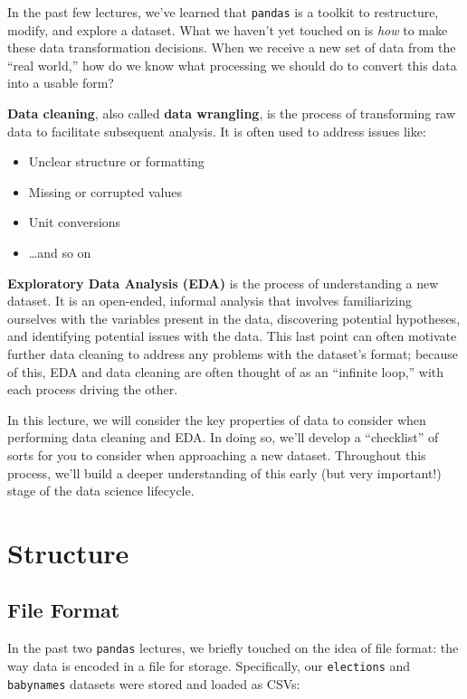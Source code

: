 \documentclass[
  letterpaper,
  DIV=11,
  numbers=noendperiod]{scrreprt}
\providecommand{\tightlist}{%
  \setlength{\itemsep}{0pt}\setlength{\parskip}{0pt}}\usepackage{longtable,booktabs,array}
\begin{document}
In the past few lectures, we've learned that \texttt{pandas} is a
toolkit to restructure, modify, and explore a dataset. What we haven't
yet touched on is \emph{how} to make these data transformation
decisions. When we receive a new set of data from the ``real world,''
how do we know what processing we should do to convert this data into a
usable form?

\textbf{Data cleaning}, also called \textbf{data wrangling}, is the
process of transforming raw data to facilitate subsequent analysis. It
is often used to address issues like:

\begin{itemize}
\tightlist
\item
  Unclear structure or formatting
\item
  Missing or corrupted values
\item
  Unit conversions
\item
  \ldots and so on
\end{itemize}

\textbf{Exploratory Data Analysis (EDA)} is the process of understanding
a new dataset. It is an open-ended, informal analysis that involves
familiarizing ourselves with the variables present in the data,
discovering potential hypotheses, and identifying potential issues with
the data. This last point can often motivate further data cleaning to
address any problems with the dataset's format; because of this, EDA and
data cleaning are often thought of as an ``infinite loop,'' with each
process driving the other.

In this lecture, we will consider the key properties of data to consider
when performing data cleaning and EDA. In doing so, we'll develop a
``checklist'' of sorts for you to consider when approaching a new
dataset. Throughout this process, we'll build a deeper understanding of
this early (but very important!) stage of the data science lifecycle.

\hypertarget{structure}{%
\section{Structure}\label{structure}}

\hypertarget{file-format}{%
\subsection{File Format}\label{file-format}}

In the past two \texttt{pandas} lectures, we briefly touched on the idea
of file format: the way data is encoded in a file for storage.
Specifically, our \texttt{elections} and \texttt{babynames} datasets
were stored and loaded as CSVs:
\end{document}

